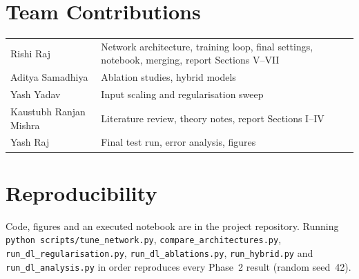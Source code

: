 \documentclass[conference]{IEEEtran}
\begin{document}
\section*{Team Contributions}
\begin{tabular}{@{}p{}p{}@{}}
Rishi Raj        & Network architecture, training loop, final settings, notebook, merging, report Sections V--VII \\
Aditya Samadhiya & Ablation studies, hybrid models \\
Yash Yadav       & Input scaling and regularisation sweep \\
Kaustubh Ranjan Mishra & Literature review, theory notes, report Sections I--IV \\
Yash Raj         & Final test run, error analysis, figures \\
\end{tabular}

\section*{Reproducibility}
Code, figures and an executed notebook are in the project repository. Running
\texttt{python scripts/tune\_network.py}, \texttt{compare\_architectures.py},
\texttt{run\_dl\_regularisation.py}, \texttt{run\_dl\_ablations.py}, \texttt{run\_hybrid.py}
and \texttt{run\_dl\_analysis.py} in order reproduces every Phase~2 result (random seed~42).



\end{document}
